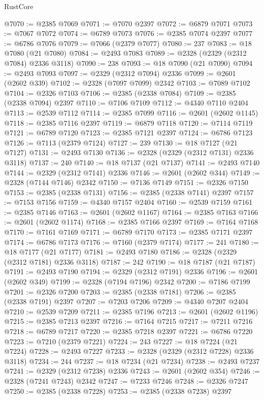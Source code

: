 \begin{lexlean}{RustCore}
\begin{coremodule}
@7070 := @2385 @7069
@7071 := @7070 @2397
@7072 := @6879 @7071
@7073 := @7067 @7072
@7074 := @6789 @7073
@7076 := @2385 @7074 @2397
@7077 := @6786 @7076
@7079 := @7066 (@2379 @7077)
@7080 := 237
@7083 := @18 @7080 (@21 @7080)
@7084 := @2493 @7083
@7089 := @2328 (@2329 (@2312 @7084) @2336 @3118)
@7090 := 238
@7093 := @18 @7090 (@21 @7090)
@7094 := @2493 @7093
@7097 := @2329 (@2312 @7094) @2336
@7099 := @2601 (@2602 @339)
@7102 := @2328 (@7097 @7099) @2342
@7103 := @7089 @7102
@7104 := @2326 @7103
@7106 := @2385 (@2338 @7084)
@7109 := @2385 (@2338 @7094) @2397
@7110 := @7106 @7109
@7112 := @4340 @7110 @2404
@7113 := @2539 @7112
@7114 := @2385 @7099
@7116 := @2601 (@2602 @1145)
@7118 := @2385 @7116 @2397
@7119 := @6879 @7118
@7120 := @7114 @7119
@7121 := @6789 @7120
@7123 := @2385 @7121 @2397
@7124 := @6786 @7123
@7126 := @7113 (@2379 @7124)
@7127 := 239
@7130 := @18 @7127 (@21 @7127)
@7131 := @2493 @7130
@7136 := @2328 (@2329 (@2312 @7131) @2336 @3118)
@7137 := 240
@7140 := @18 @7137 (@21 @7137)
@7141 := @2493 @7140
@7144 := @2329 (@2312 @7141) @2336
@7146 := @2601 (@2602 @344)
@7149 := @2328 (@7144 @7146) @2342
@7150 := @7136 @7149
@7151 := @2326 @7150
@7153 := @2385 (@2338 @7131)
@7156 := @2385 (@2338 @7141) @2397
@7157 := @7153 @7156
@7159 := @4340 @7157 @2404
@7160 := @2539 @7159
@7161 := @2385 @7146
@7163 := @2601 (@2602 @1167)
@7164 := @2385 @7163
@7166 := @2601 (@2602 @1174)
@7168 := @2385 @7166 @2397
@7169 := @7164 @7168
@7170 := @7161 @7169
@7171 := @6789 @7170
@7173 := @2385 @7171 @2397
@7174 := @6786 @7173
@7176 := @7160 (@2379 @7174)
@7177 := 241
@7180 := @18 @7177 (@21 @7177)
@7181 := @2493 @7180
@7186 := @2328 (@2329 (@2312 @7181) @2336 @3118)
@7187 := 242
@7190 := @18 @7187 (@21 @7187)
@7191 := @2493 @7190
@7194 := @2329 (@2312 @7191) @2336
@7196 := @2601 (@2602 @349)
@7199 := @2328 (@7194 @7196) @2342
@7200 := @7186 @7199
@7201 := @2326 @7200
@7203 := @2385 (@2338 @7181)
@7206 := @2385 (@2338 @7191) @2397
@7207 := @7203 @7206
@7209 := @4340 @7207 @2404
@7210 := @2539 @7209
@7211 := @2385 @7196
@7213 := @2601 (@2602 @1196)
@7215 := @2385 @7213 @2397
@7216 := @7164 @7215
@7217 := @7211 @7216
@7218 := @6789 @7217
@7220 := @2385 @7218 @2397
@7221 := @6786 @7220
@7223 := @7210 (@2379 @7221)
@7224 := 243
@7227 := @18 @7224 (@21 @7224)
@7228 := @2493 @7227
@7233 := @2328 (@2329 (@2312 @7228) @2336 @3118)
@7234 := 244
@7237 := @18 @7234 (@21 @7234)
@7238 := @2493 @7237
@7241 := @2329 (@2312 @7238) @2336
@7243 := @2601 (@2602 @354)
@7246 := @2328 (@7241 @7243) @2342
@7247 := @7233 @7246
@7248 := @2326 @7247
@7250 := @2385 (@2338 @7228)
@7253 := @2385 (@2338 @7238) @2397

\end{coremodule}
\end{lexlean}
